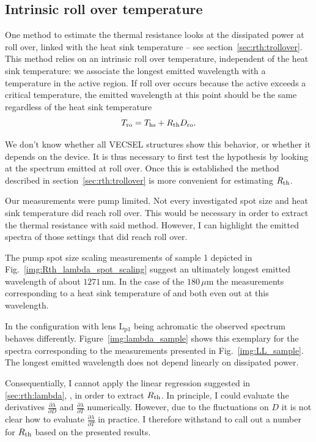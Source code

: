 \subsection{Intrinsic roll over temperature}
\label{sec:eval:trollover}

One method to estimate the thermal resistance
looks at the dissipated power at roll over,
linked with the heat sink temperature --
see section~\ref{sec:rth:trollover}.
This method relies on an intrinsic roll over temperature,
independent of the heat sink temperature:
we associate
the longest emitted wavelength
with a temperature
in the active region.
If roll over occurs
because the active
exceeds a critical temperature,
the emitted wavelength
at this point
should be the same
regardless of the heat sink temperature
\begin{equation}
T_\mathrm{ro} = T_\mathrm{hs} + R_\mathrm{th} D_\mathrm{ro}.
\end{equation}

We don't know
whether all VECSEL structures
show this behavior,
or whether it depends on the device.
It is thus necessary
to first test the hypothesis
by looking at the spectrum
emitted at roll over.
Once this is established
the method described
in section~\ref{sec:rth:trollover}
is more convenient
for estimating $R_\mathrm{th}$.

Our measurements
were pump limited.
Not every investigated 
spot size and heat sink temperature
did reach roll over.
This would be necessary
in order to extract
the thermal resistance
with said method.
However,
I can highlight
the emitted spectra
of those settings that did reach roll over.

The pump spot size scaling measurements
of sample 1
depicted in Fig.~\ref{img:Rth_lambda_spot_scaling}
suggest an ultimately
longest emitted wavelength
of about $1271\,\mathrm{nm}$.
In the case of the $180\,\mu\mathrm{m}$
the measurements corresponding to
a heat sink temperature of
 and 
both even out at this wavelength.

In the configuration
with lens $\mathrm{L}_\mathrm{p1}$
being achromatic
the observed spectrum behaves differently.
Figure~\ref{img:lambda_sample}
shows this exemplary
for the spectra
corresponding to
the measurements presented
in Fig.~\ref{img:LL_sample}.
The longest emitted wavelength
does not depend linearly
on dissipated power.

Consequentially,
I cannot apply the linear regression
suggested in \ref{sec:rth:lambda},
\cite{Heinen2012},
in order to extract $R_\mathrm{th}$.
In principle,
I could evaluate the derivatives
$\frac{\partial \lambda}{\partial D}$
and $\frac{\partial \lambda}{\partial T}$
numerically.
However,
due to the fluctuations on $D$
it is not clear
how to evaluate
$\frac{\partial \lambda}{\partial T}$
in practice.
I therefore withstand
to call out a number for $R_\mathrm{th}$
based on the presented results.

